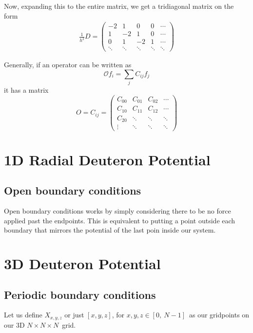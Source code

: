 \documentclass[12p,a4paper]{article}
\begin{document}
Now, expanding this to the entire matrix, we get a tridiagonal matrix on the form
\begin{align}
    \frac{1}{h^2}D=
    \begin{pmatrix}
        -2& 1&  0&  0& \cdots \\
        1& -2&  1&  0& \cdots \\
        0&  1& -2&  1& \cdots \\
        \ddots& \ddots& \ddots& \ddots& \ddots 
    \end{pmatrix}
\end{align}

Generally, if an operator can be written as
\[
    \mathcal{O}f_i = \sum_j C_{ij}f_j
\]
it has a matrix
\[
    O = C_{ij} = 
        \begin{pmatrix}
            C_{00} & C_{01} & C_{02} & \cdots \\
            C_{10} & C_{11} & C_{12} & \cdots \\
            C_{20} & \ddots & \ddots & \ddots \\
            \vdots & \ddots & \ddots & \ddots
        \end{pmatrix}
\]





\newpage



\section{1D Radial Deuteron Potential}
\subsection{Open boundary conditions}
Open boundary conditions works by simply considering there to be no force applied past the endpoints. This is equivalent to putting a point outside each boundary that mirrors the potential of the last poin inside our system.




\section{3D Deuteron Potential}
\subsection{Periodic boundary conditions}
Let us define $X_{x,y,z}$ or just $[x,y,z]$, for $x,y,z \in [0,\ N-1]$ as our gridpoints on our 3D $N\times N\times N$ grid.
\end{document}
